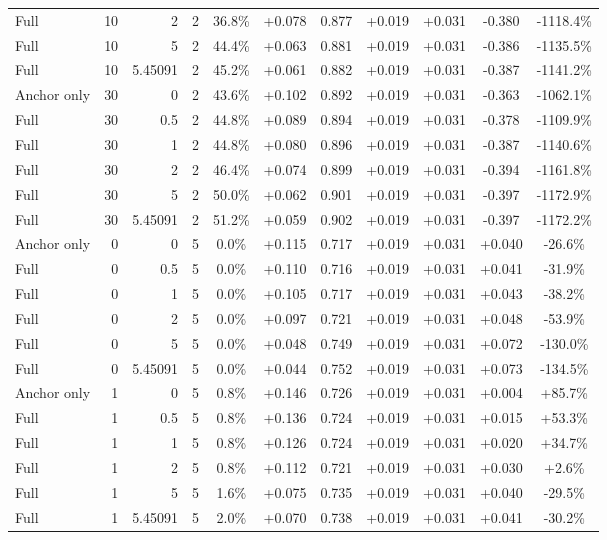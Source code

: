 \begin{table}[htbp]
\begin{tabular}{lrrrccccccc}
Full & 10 & 2 & 2 & 36.8\% & +0.078 & 0.877 & +0.019 & +0.031 & -0.380 & -1118.4\% \\
Full & 10 & 5 & 2 & 44.4\% & +0.063 & 0.881 & +0.019 & +0.031 & -0.386 & -1135.5\% \\
Full & 10 & 5.45091 & 2 & 45.2\% & +0.061 & 0.882 & +0.019 & +0.031 & -0.387 & -1141.2\% \\
Anchor only & 30 & 0 & 2 & 43.6\% & +0.102 & 0.892 & +0.019 & +0.031 & -0.363 & -1062.1\% \\
Full & 30 & 0.5 & 2 & 44.8\% & +0.089 & 0.894 & +0.019 & +0.031 & -0.378 & -1109.9\% \\
Full & 30 & 1 & 2 & 44.8\% & +0.080 & 0.896 & +0.019 & +0.031 & -0.387 & -1140.6\% \\
Full & 30 & 2 & 2 & 46.4\% & +0.074 & 0.899 & +0.019 & +0.031 & -0.394 & -1161.8\% \\
Full & 30 & 5 & 2 & 50.0\% & +0.062 & 0.901 & +0.019 & +0.031 & -0.397 & -1172.9\% \\
Full & 30 & 5.45091 & 2 & 51.2\% & +0.059 & 0.902 & +0.019 & +0.031 & -0.397 & -1172.2\% \\
Anchor only & 0 & 0 & 5 & 0.0\% & +0.115 & 0.717 & +0.019 & +0.031 & +0.040 & -26.6\% \\
Full & 0 & 0.5 & 5 & 0.0\% & +0.110 & 0.716 & +0.019 & +0.031 & +0.041 & -31.9\% \\
Full & 0 & 1 & 5 & 0.0\% & +0.105 & 0.717 & +0.019 & +0.031 & +0.043 & -38.2\% \\
Full & 0 & 2 & 5 & 0.0\% & +0.097 & 0.721 & +0.019 & +0.031 & +0.048 & -53.9\% \\
Full & 0 & 5 & 5 & 0.0\% & +0.048 & 0.749 & +0.019 & +0.031 & +0.072 & -130.0\% \\
Full & 0 & 5.45091 & 5 & 0.0\% & +0.044 & 0.752 & +0.019 & +0.031 & +0.073 & -134.5\% \\
Anchor only & 1 & 0 & 5 & 0.8\% & +0.146 & 0.726 & +0.019 & +0.031 & +0.004 & +85.7\% \\
Full & 1 & 0.5 & 5 & 0.8\% & +0.136 & 0.724 & +0.019 & +0.031 & +0.015 & +53.3\% \\
Full & 1 & 1 & 5 & 0.8\% & +0.126 & 0.724 & +0.019 & +0.031 & +0.020 & +34.7\% \\
Full & 1 & 2 & 5 & 0.8\% & +0.112 & 0.721 & +0.019 & +0.031 & +0.030 & +2.6\% \\
Full & 1 & 5 & 5 & 1.6\% & +0.075 & 0.735 & +0.019 & +0.031 & +0.040 & -29.5\% \\
Full & 1 & 5.45091 & 5 & 2.0\% & +0.070 & 0.738 & +0.019 & +0.031 & +0.041 & -30.2\% \\

\end{tabular}
\end{table}
